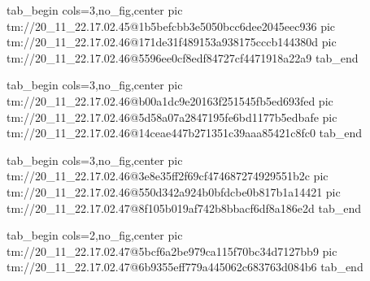  
 
 
 
 

\qqSecCmtScr


\ifcmt
  tab_begin cols=3,no_fig,center
    pic tm://20_11_22.17.02.45@1b5befcbb3e5050bcc6dee2045eec936
    pic tm://20_11_22.17.02.46@171de31f489153a938175cccb144380d
    pic tm://20_11_22.17.02.46@5596ee0cf8edf84727cf4471918a22a9
  tab_end
\fi


\ifcmt
  tab_begin cols=3,no_fig,center
    pic tm://20_11_22.17.02.46@b00a1dc9e20163f251545fb5ed693fed
    pic tm://20_11_22.17.02.46@5d58a07a2847195fe6bd1177b5edbafe
    pic tm://20_11_22.17.02.46@14ceae447b271351c39aaa85421c8fc0
  tab_end
\fi


\ifcmt
  tab_begin cols=3,no_fig,center
    pic tm://20_11_22.17.02.46@3e8e35ff2f69cf474687274929551b2c
    pic tm://20_11_22.17.02.46@550d342a924b0bfdcbe0b817b1a14421
    pic tm://20_11_22.17.02.47@8f105b019af742b8bbacf6df8a186e2d
  tab_end
\fi


\ifcmt
  tab_begin cols=2,no_fig,center
    pic tm://20_11_22.17.02.47@5bcf6a2be979ca115f70bc34d7127bb9
    pic tm://20_11_22.17.02.47@6b9355eff779a445062c683763d084b6
  tab_end
\fi

